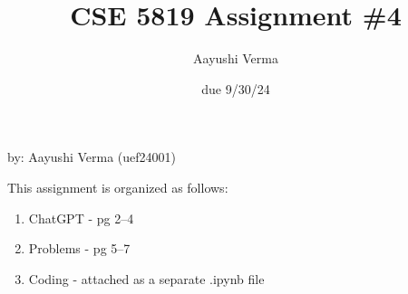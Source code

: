 \documentclass{article}
\title{CSE 5819 Assignment \#4}
\author{Aayushi Verma}
\date{due 9/30/24}
\begin{document}
\maketitle
\begin{center}
    by: Aayushi Verma (uef24001)
\end{center}

This assignment is organized as follows:

\begin{enumerate}
    \item ChatGPT - pg 2--4%
    \item Problems - pg 5--7%
    \item Coding - attached as a separate .ipynb file
\end{enumerate}

\label{chatgpt_start}
 
\label{chatgpt_end}

\label{problems_start}
  
\label{problems_end}
\end{document}
